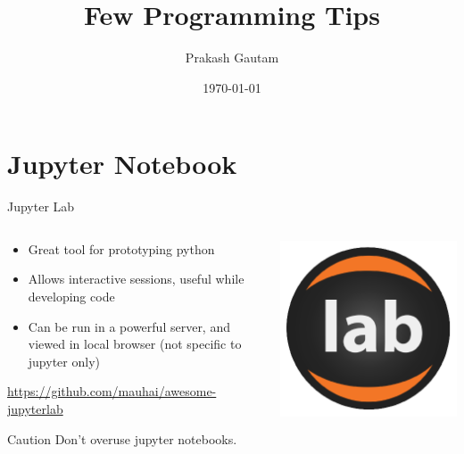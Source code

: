 \documentclass[aspectratio=169]{beamer}
\author{Prakash Gautam \\ \Nepali{[ प्रकाश गौतम ]}}
\title{Few Programming Tips}
\date{\today}
\begin{document}
\titlepage

\renewcommand{\bf}[1]{\textcolor{red!60}{#1}}

%
%
\section{Jupyter Notebook}
%
\begin{frame}{Jupyter Lab}
    \begin{columns}
        \begin{column}{0.49\textwidth}
            \begin{itemize}
                \item Great tool for prototyping python
                \item Allows interactive sessions, useful while developing code
                \item Can be run in a powerful server, and viewed in local browser (not specific to jupyter only)
            \end{itemize}
            \href{https://github.com/mauhai/awesome-jupyterlab}{\textcolor{green!40}{https://github.com/mauhai/awesome-jupyterlab}}
            \begin{block}{Caution}
                Don't overuse jupyter notebooks.
            \end{block}
        \end{column}
        \begin{column}{0.49\textwidth}
            \begin{center}
                \includegraphics[width=0.4\linewidth]{images/jupyter_logo.png}
            \end{center}
        \end{column}
    \end{columns}
\end{frame} 
\end{document}
